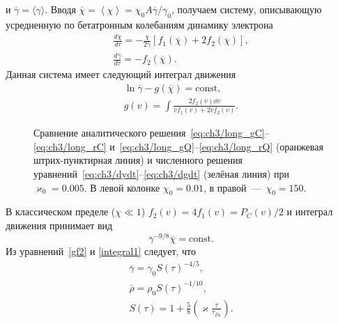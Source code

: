 и $\overline{\gamma} = \langle\gamma\rangle$.
Вводя $\overline{\chi}=\left\langle \chi\right\rangle = \chi_0 A \overline{\gamma} / \gamma_0$, получаем систему, описывающую усредненную по бетатронным колебаниям динамику электрона
\begin{gather}
    \label{v}
    \frac{d\overline{\chi}}{d\tau} = -\frac{\overline{\chi}}{2\overline{\gamma}}\left[f_{1}\left(\overline{\chi}\right)+2f_{2}\left(\overline{\chi} \right)\right],\\
    \label{gf2}
    \frac{d\overline{\gamma}}{d\tau} = -f_{2}\left(\overline{\chi } \right).
\end{gather}
Данная система имеет следующий интеграл движения
\begin{gather}
    \ln \overline{\gamma} - g (\overline{\chi} )  = \mathrm{const} \label{integral} , \\
    g (v) = \int \frac{2f_{2}(v)\dd v} {v f_{1}\left(v \right)+2 v f_{2}\left(v \right)}.
\end{gather}
\begin{figure}[ht]
	\caption[Сравнение аналитического и численного решений уравнений движения частиц при столкновении длинных пучков в режиме слабого пучкового излучения]{\label{fig:ch3/sec3/long} 
    Сравнение аналитического решения~\eqref{eq:ch3/long_gC}--\eqref{eq:ch3/long_rC} и~\eqref{eq:ch3/long_gQ}--\eqref{eq:ch3/long_rQ} (оранжевая штрих-пунктирная линия) и численного решения уравнений~\eqref{eq:ch3/dydt}--\eqref{eq:ch3/dgdt} (зелёная линия) при $\varkappa_0=0.005$. В левой колонке $\chi_0=0.01$, в правой~---~$\chi_0=150$.}
	\label{long}
\end{figure}
В классическом пределе ($\chi \ll 1$) $f_{2}(v) = 4 f_{1}(v)=P_C(v)/2$ и интеграл движения принимает вид
\begin{equation}
    \overline{\gamma}^{-9/8} \overline{\chi} = \text{const}.\label{integral1}
\end{equation}
Из уравнений~\eqref{gf2} и \eqref{integral1} следует, что
\begin{gather}
    \label{eq:ch3/long_gC}
    \overline{\gamma} = \gamma_{0} S(\tau)^{-4/5} ,\\
    \label{eq:ch3/long_rC}
    \overline \rho = \rho_{0} S(\tau)^{-1/10},\\
    S(\tau) = 1+\frac{5}{8}\left( \varkappa\frac{\tau}{\tau_{D_0}} \right).
\end{gather}
